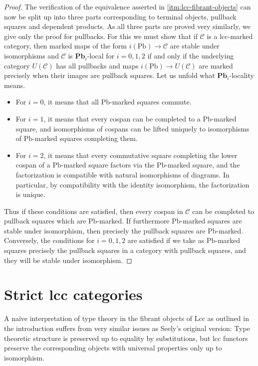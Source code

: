 \documentclass[a4paper]{article}
\theoremstyle{remark}
\theoremstyle{definition}
\begin{document}
\begin{proof}
  The verification of the equivalence asserted in \ref{itm:lcc-fibrant-objects} can now be split up into three parts corresponding to terminal objects, pullback squares and dependent products.
  As all three parts are proved very similarly, we give only the proof for pullbacks.
  For this we must show that if $\mathcal{C}$ is a lcc-marked category, then marked maps of the form $i(\mathrm{Pb}) \rightarrow \mathcal{C}$ are stable under isomorphisms and $\mathcal{C}$ is $\mathbf{Pb}_i$-local for $i = 0, 1, 2$ if and only if the underlying category $U(\mathcal{C})$ has all pullbacks and maps $i(\mathrm{Pb}) \rightarrow U(\mathcal{C})$ are marked precisely when their images are pullback squares.
  Let us unfold what $\mathbf{Pb}_i$-locality means.
  \begin{itemize}
    \item
      For $i = 0$, it means that all $\mathrm{Pb}$-marked squares commute.
    \item
      For $i = 1$, it means that every cospan can be completed to a $\mathrm{Pb}$-marked square, and isomorphisms of cospans can be lifted uniquely to isomorphisms of $\mathrm{Pb}$-marked squares completing them.
    \item
      For $i = 2$, it means that every commutative square completing the lower cospan of a $\mathrm{Pb}$-marked square factors via the $\mathrm{Pb}$-marked square, and the factorization is compatible with natural isomorphisms of diagrams.
      In particular, by compatibility with the identity isomorphism, the factorization is unique.
  \end{itemize}
  Thus if these conditions are satisfied, then every cospan in $\mathcal{C}$ can be completed to pullback squares which are $\mathrm{Pb}$-marked.
  If furthermore $\mathrm{Pb}$-marked squares are stable under isomorphism, then precisely the pullback squares are $\mathrm{Pb}$-marked.
  Conversely, the conditions for $i = 0, 1, 2$ are satisfied if we take as $\mathrm{Pb}$-marked squares precisely the pullback squares in a category with pullback squares, and they will be stable under isomorphism.
\end{proof}

\section{Strict lcc categories}
\label{sec:slcc}

A naïve interpretation of type theory in the fibrant objects of $\mathrm{Lcc}$ as outlined in the introduction suffers from very similar issues as Seely's original version:
Type theoretic structure is preserved up to equality by substitutions, but lcc functors preserve the corresponding objects with universal properties only up to isomorphism.
\end{document}
